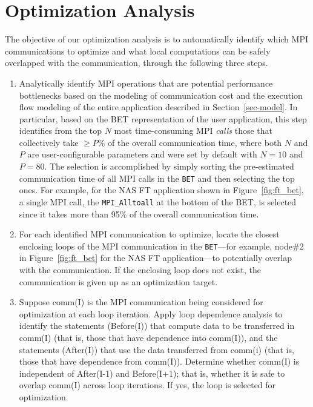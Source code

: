 \section{Optimization Analysis}
\label {sec-analysis}

The objective of our optimization analysis is to automatically identify which MPI communications to optimize
and  what local computations can be safely overlapped with the communication, through the following three steps.

\begin{enumerate}

\item Analytically identify MPI operations that are potential
  performance bottlenecks based on the modeling of communication cost
  and the execution flow modeling of the entire application described
  in Section~\ref{sec-model}.  In particular, based on the BET
  representation of the user application, this step identifies from the top
  $N$ most time-consuming MPI \emph{calls} those that collectively take $\geq P\%$
  of the overall communication time, where both $N$ and $P$ are
  user-configurable parameters and were set by default with $N=10$ and
  $P=80$.  The selection is accomplished by simply sorting the
  pre-estimated communication time of all MPI calls in the
  \texttt{BET} and then selecting the top ones.  For example, for the
  NAS FT application shown in Figure~\ref{fig:ft_bet}, a single MPI
  call, the \texttt{MPI\_Alltoall} at the bottom of the BET, is
  selected since it takes more than 95\% of the overall communication
  time.

\item For each identified MPI communication to optimize, locate the closest
  enclosing loops of the MPI communication in the \texttt{BET}---for
  example, node\#2 in Figure~\ref{fig:ft_bet} for the NAS FT
  application---to potentially overlap with the communication.  If the
  enclosing loop does not exist, the communication is given up as an
  optimization target.

\item  Suppose comm(I) is the MPI communication being considered for optimization at each loop iteration. 
Apply loop dependence analysis to identify the statements (Before(I)) that compute data to be transferred in comm(I) (that is, those that have dependence into comm(I)), and the statements (After(I)) that  use the data transferred from comm(i) (that is, those that have dependence from comm(I)). Determine whether comm(I) is independent of After(I-1) and Before(I+1); that is, whether
it is safe to overlap comm(I) across loop iterations. If yes, the loop is selected for optimization. 
\end{enumerate}

